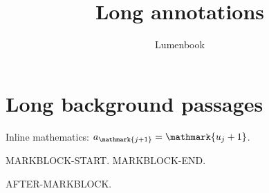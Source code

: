 \documentclass[print]{lumenbook}
\title{Long annotations}
\author{Lumenbook}
\begin{document}
\chapter{Long background passages}
Inline mathematics: $a_{\mathmark{j+1}}=\mathmark{u_j+1}$.
\begin{markblock}
MARKBLOCK-START.
\lipsum[1-6]
MARKBLOCK-END.
\end{markblock}
AFTER-MARKBLOCK.
\end{document}
